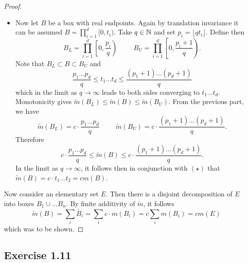 \documentclass[hw_all.tex]{subfiles}
\begin{document}
\begin{proof}
\begin{itemize}
        \item 
            Now let $B$ be a box with real endpoints. Again by translation invariance it can be assumed $B = \prod_{i=1}^d [0, t_i)$. Take $q \in \mathbb{N}$ and set $p_i = \lfloor qt_i \rfloor$. Define then
            \[
                B_L = \prod_{i=1}^d \left[0, \frac{p_i}{q}\right) \hspace{1cm} B_U = \prod_{i=1}^d \left[0, \frac{p_i + 1}{q}\right)
            .\]
            Note that $B_L \subset B \subset B_U$ and 
            \[
                \frac{p_1 \ldots p_d}{q} \leq t_1 \ldots t_d \leq \frac{(p_1 + 1)\ldots(p_d + 1)}{q} \tag{\star}
            \]
            which in the limit as $q \to \infty$ leads to both sides converging to $t_1 \ldots t_d$. Monotonicity gives $\tilde{m}(B_L) \leq \tilde{m}(B) \leq \tilde{m}(B_U)$. From the previous part, we have
            \[
                \tilde{m}(B_L) = c \cdot \frac{p_1 \ldots p_d}{q} \hspace{1cm} \tilde{m}(B_U) = c \cdot \frac{(p_1 + 1) \ldots (p_d + 1)}{q}
            .\]
            Therefore
            \[
                c \cdot \frac{p_1 \ldots p_d}{q} \leq \tilde{m}(B) \leq c \cdot \frac{(p_1 + 1) \ldots (p_d + 1)}{q}
            .\]
            In the limit as $q \to \infty$, it follows then in conjunction with $(\star)$ that $\tilde{m}(B) = c \cdot t_1 \ldots t_2 = c m(B)$.
    \end{itemize}
    Now consider an elementary set $E$. Then there is a disjoint decomposition of $E$ into boxes $B_1 \cup \ldots B_n$. By finite additivity of $\tilde{m}$, it follows
    \[
        \tilde{m}(B) = \sum_{i} \tilde{B_i} = \sum_{i} c \cdot m(B_i) = c \sum_{i} m(B_i) = c m(E)
    \]
    which was to be shown.
\end{proof}

\subsection{Exercise 1.11}
\end{document}
